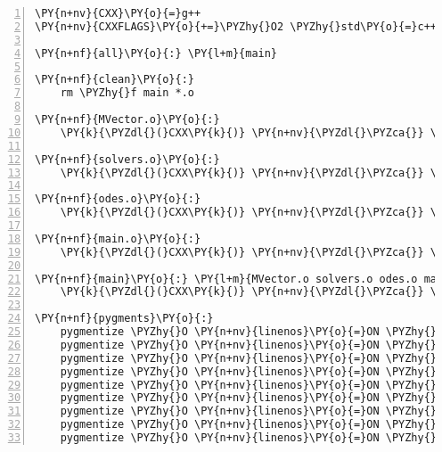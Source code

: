 \begin{Verbatim}[tabsize=2,commandchars=\\\{\},numbers=left,firstnumber=1,stepnumber=1]
\PY{n+nv}{CXX}\PY{o}{=}g++
\PY{n+nv}{CXXFLAGS}\PY{o}{+=}\PYZhy{}O2 \PYZhy{}std\PY{o}{=}c++11 \PYZhy{}static

\PY{n+nf}{all}\PY{o}{:} \PY{l+m}{main}

\PY{n+nf}{clean}\PY{o}{:}
	rm \PYZhy{}f main *.o

\PY{n+nf}{MVector.o}\PY{o}{:}
	\PY{k}{\PYZdl{}(}CXX\PY{k}{)} \PY{n+nv}{\PYZdl{}\PYZca{}} \PY{k}{\PYZdl{}(}CXXFLAGS\PY{k}{)} MVector.cpp \PYZhy{}c

\PY{n+nf}{solvers.o}\PY{o}{:}
	\PY{k}{\PYZdl{}(}CXX\PY{k}{)} \PY{n+nv}{\PYZdl{}\PYZca{}} \PY{k}{\PYZdl{}(}CXXFLAGS\PY{k}{)} solvers.cpp \PYZhy{}c

\PY{n+nf}{odes.o}\PY{o}{:}
	\PY{k}{\PYZdl{}(}CXX\PY{k}{)} \PY{n+nv}{\PYZdl{}\PYZca{}} \PY{k}{\PYZdl{}(}CXXFLAGS\PY{k}{)} odes.cpp \PYZhy{}c

\PY{n+nf}{main.o}\PY{o}{:}
	\PY{k}{\PYZdl{}(}CXX\PY{k}{)} \PY{n+nv}{\PYZdl{}\PYZca{}} \PY{k}{\PYZdl{}(}CXXFLAGS\PY{k}{)} main.cpp \PYZhy{}c

\PY{n+nf}{main}\PY{o}{:} \PY{l+m}{MVector.o solvers.o odes.o main.o}
	\PY{k}{\PYZdl{}(}CXX\PY{k}{)} \PY{n+nv}{\PYZdl{}\PYZca{}} \PY{k}{\PYZdl{}(}CXXFLAGS\PY{k}{)} \PYZhy{}o \PY{n+nv}{\PYZdl{}@}

\PY{n+nf}{pygments}\PY{o}{:}
	pygmentize \PYZhy{}O \PY{n+nv}{linenos}\PY{o}{=}ON \PYZhy{}f latex main.cpp \PYZgt{} ../main.cpp.tex
	pygmentize \PYZhy{}O \PY{n+nv}{linenos}\PY{o}{=}ON \PYZhy{}f latex solvers.hpp \PYZgt{} ../solvers.hpp.tex
	pygmentize \PYZhy{}O \PY{n+nv}{linenos}\PY{o}{=}ON \PYZhy{}f latex MVector.hpp \PYZgt{} ../mvector.tex
	pygmentize \PYZhy{}O \PY{n+nv}{linenos}\PY{o}{=}ON \PYZhy{}f latex MFunction.hpp \PYZgt{} ../MFunction.tex
	pygmentize \PYZhy{}O \PY{n+nv}{linenos}\PY{o}{=}ON \PYZhy{}f latex MVector.cpp \PYZgt{} ../MVector.cpp.tex
	pygmentize \PYZhy{}O \PY{n+nv}{linenos}\PY{o}{=}ON \PYZhy{}f latex Makefile \PYZgt{} ../makefile.tex
	pygmentize \PYZhy{}O \PY{n+nv}{linenos}\PY{o}{=}ON \PYZhy{}f latex solvers.cpp \PYZgt{} ../solvers.cpp.tex
	pygmentize \PYZhy{}O \PY{n+nv}{linenos}\PY{o}{=}ON \PYZhy{}f latex odes.cpp \PYZgt{} ../odes.cpp.tex
	pygmentize \PYZhy{}O \PY{n+nv}{linenos}\PY{o}{=}ON \PYZhy{}f latex odes.hpp \PYZgt{} ../odes.hpp.tex
\end{Verbatim}
